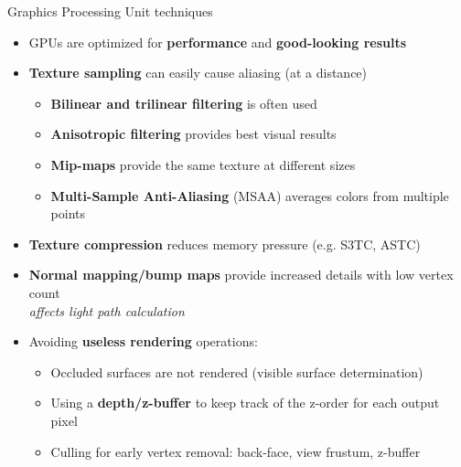 \begin{frame}{Graphics Processing Unit techniques}
  \begin{itemize}
  \item GPUs are optimized for \textbf{performance} and \textbf{good-looking results}
  \item \textbf{Texture sampling} can easily cause aliasing (at a distance)
    \begin{itemize}
    \item \textbf{Bilinear and trilinear filtering} is often used
    \item \textbf{Anisotropic filtering} provides best visual results
    \item \textbf{Mip-maps} provide the same texture at different sizes
    \item \textbf{Multi-Sample Anti-Aliasing} (MSAA) averages colors from multiple points
    \end{itemize}
  \item \textbf{Texture compression} reduces memory pressure (e.g. S3TC, ASTC)
  \item \textbf{Normal mapping/bump maps} provide increased details with low vertex count\\
    \textit{affects light path calculation}
  \item Avoiding \textbf{useless rendering} operations:
    \begin{itemize}
    \item Occluded surfaces are not rendered (visible surface determination)
    \item Using a \textbf{depth/z-buffer} to keep track of the z-order for each output pixel
    \item Culling for early vertex removal: back-face, view frustum, z-buffer
    \end{itemize}
  \end{itemize}
\end{frame}

